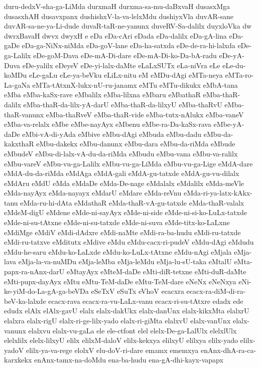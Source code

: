 {duru-dedxV-sha-ga-LiMda
durxmaH
durxma-sa-mu-daBxvaH
dusasxMga
dusasxhAH
dusavxpanx
dushishxV-la-va-lelxMdu
dushiyxVla
duvAR-sane
duvAR-sa-ne-ya-Li-dude
duvaR-taR-ne-yanunx
duveRV-Sa-dalilx
duyxloVka
dw
dwrxBavaH
dwvx
dwyxH
e
eDa
eDa-cAri
eDada
eDa-dalilx
eDa-gA-lina
eDa-gaDe
eDa-ga-NiNx-niMda
eDa-goV-lane
eDa-ha-satxda
eDe-de-ra-hi-lalxda
eDe-ga-Lalilx
eDe-goM-Dava
eDe-mA-Di-dare
eDe-mA-Di-ko-Da-bA-radu
eDe-yA-Duva
eDe-yalilx
eDeyeV
eDe-yi-lalx-daMte
eLaLxSUTx
eLa-niVra
eLe
eLe-du-koMDu
eLe-gaLu
eLe-ya-beVku
eLiLx-nitu
eM
eMDu-dAgi
eMTa-neya
eMTa-ro-La-gaNa
eMTa-tAtxnX-lukx-nU-ru-janamx
eMTu
eMTu-dikukx
eMbA-tana
eMba
eMba-kaSx-rave
eMbalilx
eMba-lilxna
eMbaru
eMbathaR
eMba-thaR-dalilx
eMba-thaR-da-lilx-yA-darU
eMba-thaR-da-lilxyU
eMba-thaRvU
eMba-thaR-vanunx
eMba-thaRveV
eMba-thaR-vide
eMba-tutx-nAlukx
eMba-vaneV
eMba-va-relalx
eMbe
eMbe-nayAyx
eMbenu
eMbe-ra-Da-kaSx-rava
eMbe-yA-daDe
eMbi-vA-di-yAda
eMbive
eMbu-dAgi
eMbuda
eMbu-dadu
eMbu-da-kakxthaR
eMbu-dakekx
eMbu-danunx
eMbu-dara
eMbu-da-riMda
eMbude
eMbudeV
eMbu-di-lalx-vA-du-da-riMda
eMbudu
eMbu-vana
eMbu-va-ralilx
eMbu-vareV
eMbu-vu-ga-Lalilx
eMbu-vu-ga-LiMda
eMbu-vu-ga-Lige
eMdA-dare
eMdA-du-da-riMda
eMdAga
eMdA-gali
eMdA-gu-tatxde
eMdA-gu-vu-dilalx
eMdAru
eMdU
eMda
eMdaDe
eMda-De-nage
eMdalalx
eMdalilx
eMda-meVle
eMda-nayAyx
eMda-nayayx
eMdarU
eMdare
eMda-reVnu
eMda-ri-ya-latx-kAkx-tanu
eMda-ru-hi-dAta
eMdathaR
eMda-thaR-vA-gu-tatxde
eMda-thaR-valalx
eMdeM-digU
eMdene
eMde-ni-sayAyx
eMde-ni-side
eMde-ni-si-ko-LuLx-tatxde
eMde-ni-su-tAtxne
eMde-ni-su-tatxde
eMde-ni-suva
eMde-titx-ko-LaLxne
eMdiMge
eMdiV
eMdi-dAdxre
eMdi-naMte
eMdi-ra-ba-hudu
eMdi-ru-tatxde
eMdi-ru-tatxve
eMditutx
eMdive
eMdu
eMdu-cacx-ri-pudeV
eMdu-dAgi
eMdudu
eMdu-he-saru
eMdu-ko-LaLxde
eMdu-ko-LuLx-tAtxne
eMdu-nAgi
eMjala
eMja-lava
eMja-la-va-nuMDu
eMja-leMba
eMja-leMdu
eMja-lu-sU-taka
eMtalU
eMta-papx-ra-nAnx-darU
eMtayAyx
eMteM-daDe
eMti-diR-tetxne
eMti-duR-daMte
eMti-pupx-dayAyx
eMtu
eMtu-TeM-daDe
eMtu-TeM-dare
eNeNx
eNeNxya
eNi-ke-yiM-do-La-gA-ga-beVDa
eSeTxV
eSuTx
eVhoV
ecacxra
ecacx-ra-diM-di-ra-beV-ka-lalxde
ecacx-rava
ecacx-ra-vu-LaLx-vanu
ecacx-ri-su-tAtxre
edadx
ede
edudx
elAlx
elAlx-gavU
elalx
elalx-dakUkx
elalx-danUnx
elalx-kikxMta
elalxrU
elalxra
elalx-rigU
elalx-ri-ge-lilx-yado
elalx-ri-giMta
elalxvU
elalx-vanUnx
elalx-vanunx
elalxvu
elalx-vu-gaLa
ele
ele-ctfont
elel
elelx-De-ga-LalUlx
elelxlUlx
elelxlilx
elelx-lilxyU
elilx
elilxM-daloV
elilx-kekxya
elilxyU
elilxya
elilx-yado
elilx-yadoV
elilx-ya-va-rege
elolxV
elu-doV-ri-dare
emamx
ememxya
enAnx-dhA-ra-ca-karxkekx
enAnx-tamx-na-doMdu
ena-ba-hudu
ena-gA-dhi-kayx-vapapx
}
